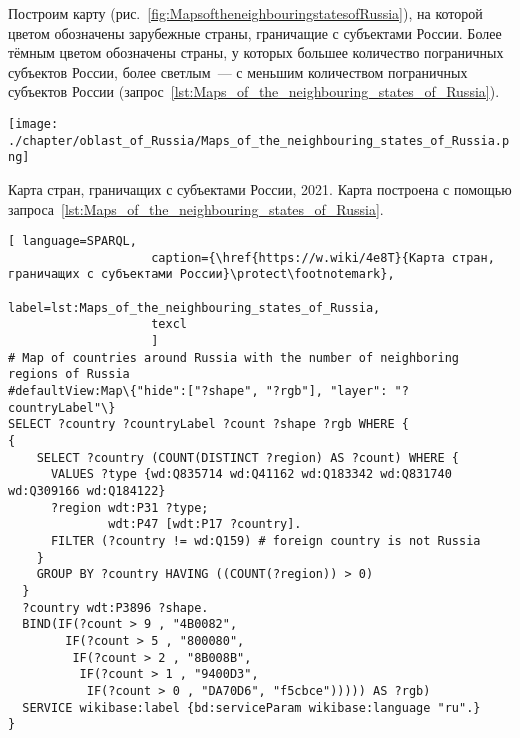 Построим карту (рис.~\ref{fig:MapsoftheneighbouringstatesofRussia}), 
на которой цветом обозначены зарубежные страны, 
граничащие с субъектами России. 
Более тёмным цветом обозначены страны, у которых большее количество пограничных субъектов России, 
более светлым~--- с меньшим количеством пограничных субъектов России 
(запрос~\ref{lst:Maps_of_the_neighbouring_states_of_Russia}).
%
\begin{marginfigure}[0\baselineskip]
	\texttt{[image: ./chapter/oblast\_of\_Russia/Maps\_of\_the\_neighbouring\_states\_of\_Russia.png]}
	\caption[Карта стран, граничащих с Россией, 2021 год.]{Карта стран, граничащих с субъектами России, 2021. Карта построена с помощью запроса~\protect\ref{lst:Maps_of_the_neighbouring_states_of_Russia}.}%
      \label{fig:MapsoftheneighbouringstatesofRussia}%
\end{marginfigure} 

\lstset{numbers=left, firstnumber=1, frame=single}
\begin{lstlisting}[ language=SPARQL, 
                    caption={\href{https://w.wiki/4e8T}{Карта стран, граничащих с субъектами России}\protect\footnotemark},
                    label=lst:Maps_of_the_neighbouring_states_of_Russia,
                    texcl 
                    ]
# Map of countries around Russia with the number of neighboring regions of Russia
#defaultView:Map\{"hide":["?shape", "?rgb"], "layer": "?countryLabel"\}
SELECT ?country ?countryLabel ?count ?shape ?rgb WHERE {
{
    SELECT ?country (COUNT(DISTINCT ?region) AS ?count) WHERE {
      VALUES ?type {wd:Q835714 wd:Q41162 wd:Q183342 wd:Q831740 wd:Q309166 wd:Q184122}
      ?region wdt:P31 ?type;
              wdt:P47 [wdt:P17 ?country].
      FILTER (?country != wd:Q159) # foreign country is not Russia
    }
    GROUP BY ?country HAVING ((COUNT(?region)) > 0)
  }
  ?country wdt:P3896 ?shape.
  BIND(IF(?count > 9 , "4B0082", 
        IF(?count > 5 , "800080", 
         IF(?count > 2 , "8B008B", 
          IF(?count > 1 , "9400D3", 
           IF(?count > 0 , "DA70D6", "f5cbce"))))) AS ?rgb)
  SERVICE wikibase:label {bd:serviceParam wikibase:language "ru".}
}
\end{lstlisting}%




\newpage
